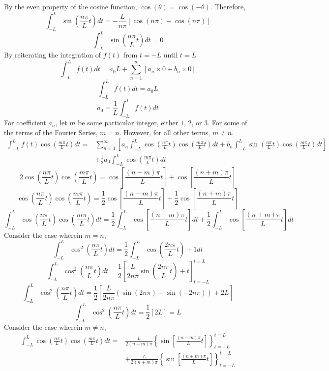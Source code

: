 By the even property of the cosine function, $\cos(\theta) = \cos(-\theta)$. Therefore,
$$\int_{-L}^{L}\sin\left(\frac{n\pi}{L}t\right)dt = -\frac{L}{n\pi}\left[\cos\left(n\pi\right) - \cos\left(n\pi\right)\right]$$
$$\int_{-L}^{L}\sin\left(\frac{n\pi}{L}t\right)dt = 0$$
By reiterating the integration of $f(t)$ from $t = -L$ until $t = L$
$$\int_{-L}^{L}f(t)dt = a_0L + \sum_{n = 1}^{\infty}\left[a_n\times 0 + b_n \times 0\right]$$
$$\int_{-L}^{L}f(t)dt = a_0L$$
$$a_0 = \frac{1}{L}\int_{-L}^{L}f(t)dt$$
For coefficient $a_n$, let $m$ be some particular integer, either $1$, $2$, or $3$. For some of the terms of the Fourier Series, $m = n$. However, for all other terms, $m\neq n$.
\begin{align*}
\int_{-L}^{L}f(t)\cos\left(\frac{m\pi}{L}t\right)dt = &\sum_{n = 1}^{\infty}\left[a_n \int_{-L}^{L}\cos\left(\frac{n\pi}{L}t\right)\cos\left(\frac{m\pi}{L}t\right)dt + b_n \int_{-L}^{L}\sin\left(\frac{n\pi}{L}t\right)\cos\left(\frac{m\pi}{L}t\right)dt\right] \\ &+ \frac{1}{2}a_0 \int_{-L}^{L}\cos\left(\frac{m\pi}{L}t\right)dt
\end{align*}
$$2\cos\left(\frac{n\pi}{L}t\right)\cos\left(\frac{m\pi}{L}t\right) = \cos\left[\frac{(n-m)\pi}{L}t\right] + \cos\left[\frac{(n+m)\pi}{L}t\right]$$
$$\cos\left(\frac{n\pi}{L}t\right)\cos\left(\frac{m\pi}{L}t\right) = \frac{1}{2}\cos\left[\frac{(n-m)\pi}{L}t\right] + \frac{1}{2}\cos\left[\frac{(n+m)\pi}{L}t\right]$$
$$\int_{-L}^{L}\cos\left(\frac{n\pi}{L}t\right)\cos\left(\frac{m\pi}{L}t\right)dt = \frac{1}{2}\int_{-L}^{L}\cos\left[\frac{(n-m)\pi}{L}t\right]dt + \frac{1}{2}\int_{-L}^{L}\cos\left[\frac{(n+m)\pi}{L}t\right]dt$$
Consider the case wherein $m = n$,
$$\int_{-L}^{L}\cos^2\left(\frac{n\pi}{L}t\right)dt = \frac{1}{2}\int_{-L}^{L}\cos\left(\frac{2n\pi}{L}t\right) + 1dt$$
$$\int_{-L}^{L}\cos^2\left(\frac{n\pi}{L}t\right)dt = \frac{1}{2}\left[\frac{L}{2n\pi}\sin\left(\frac{2n\pi}{L}t\right) + t\right]^{t = L}_{t = -L}$$
$$\int_{-L}^{L}\cos^2\left(\frac{n\pi}{L}t\right)dt = \frac{1}{2}\left[\frac{L}{2n\pi}\left(\sin\left(2n\pi\right) - \sin\left(-2n\pi\right)\right) + 2L\right]$$
$$\int_{-L}^{L}\cos^2\left(\frac{n\pi}{L}t\right)dt = \frac{1}{2}\left[2L\right] = L$$
Consider the case wherein $m\neq n$,
\begin{align*}
\int_{-L}^{L}\cos\left(\frac{n\pi}{L}t\right)\cos\left(\frac{m\pi}{L}t\right)dt = & \frac{L}{2(n-m)\pi}\left\{\sin\left[\frac{(n-m)\pi}{L}t\right]\right\}_{t = -L}^{t = L} \\ & + \frac{L}{2(n+m)\pi}\left\{\sin\left[\frac{(n+m)\pi}{L}t\right]\right\}_{t = -L}^{t = L}
\end{align*}
